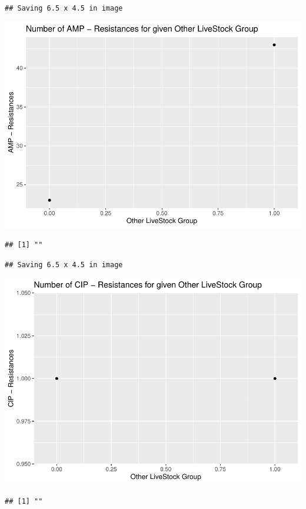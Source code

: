 \documentclass[
]{article}
\begin{document}
\begin{verbatim}
## Saving 6.5 x 4.5 in image
\end{verbatim}

\includegraphics{NResistenzen_files/figure-latex/binary_or_nominal_variables-11.pdf}

\begin{verbatim}
## [1] ""
\end{verbatim}

\begin{verbatim}
## Saving 6.5 x 4.5 in image
\end{verbatim}

\includegraphics{NResistenzen_files/figure-latex/binary_or_nominal_variables-12.pdf}

\begin{verbatim}
## [1] ""
\end{verbatim}
\end{document}
